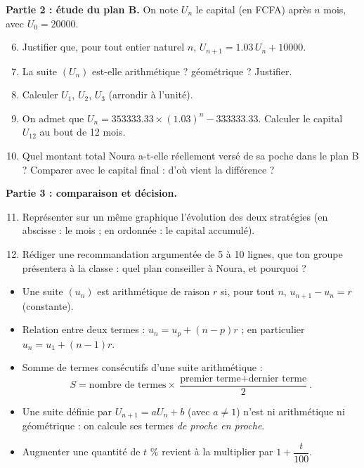 \documentclass[11pt]{article}
\newcommand{\cle}[1]{{\popxbold\color{popdark}#1}}
\newcounter{popsec}
\newcounter{popsub}
\newcommand{\courssub}[1]{%
  \stepcounter{popsub}%
  \par\vspace{9pt}\noindent{\popxbold\fontsize{11.5}{13}\selectfont\color{popink}{\color{poporange}\thepopsec.\thepopsub}\hspace{6pt}#1}\par\nopagebreak\vspace{4pt}
}
\begin{document}
\textbf{Partie 2 : étude du plan B.} On note $U_n$ le capital (en FCFA) après $n$ mois, avec $U_0=\num{20000}$.
\begin{enumerate}
\setcounter{enumi}{5}
\item Justifier que, pour tout entier naturel $n$, $U_{n+1}=\num{1,03}\,U_n+\num{10000}$.
\item La suite $(U_n)$ est-elle arithmétique ? géométrique ? Justifier.
\item Calculer $U_1$, $U_2$, $U_3$ (arrondir à l'unité).
\item On admet que $U_n=\num{353333,33}\times(\num{1,03})^n-\num{333333,33}$. Calculer le capital $U_{12}$ au bout de 12 mois.
\item Quel montant total Noura a-t-elle réellement versé de sa poche dans le plan B ? Comparer avec le capital final : d'où vient la différence ?
\end{enumerate}

\textbf{Partie 3 : comparaison et décision.}
\begin{enumerate}
\setcounter{enumi}{10}
\item Représenter sur un même graphique l'évolution des deux stratégies (en abscisse : le mois ; en ordonnée : le capital accumulé).
\item Rédiger une recommandation argumentée de 5 à 10 lignes, que ton groupe présentera à la classe : quel plan conseiller à Noura, et pourquoi ?
\end{enumerate}

\courssub{Ressources à mobiliser}

\begin{aretenir}
\begin{itemize}
\item Une suite $(u_n)$ est \cle{arithmétique} de raison $r$ si, pour tout $n$, $u_{n+1}-u_n=r$ (constante).
\item Relation entre deux termes : $u_n=u_p+(n-p)r$ ; en particulier $u_n=u_1+(n-1)r$.
\item Somme de termes consécutifs d'une suite arithmétique :
\[ S=\text{nombre de termes}\times\frac{\text{premier terme}+\text{dernier terme}}{2}. \]
\item Une suite définie par $U_{n+1}=aU_n+b$ (avec $a\neq 1$) n'est ni arithmétique ni géométrique : on calcule ses termes \emph{de proche en proche}.
\item Augmenter une quantité de $t$ \% revient à la multiplier par $1+\dfrac{t}{100}$.
\end{itemize}
\end{aretenir}
\end{document}
